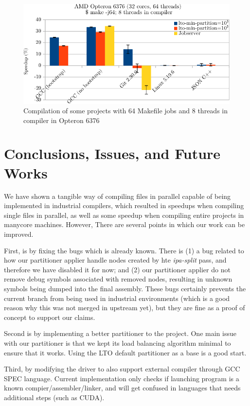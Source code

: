\documentclass[runningheads]{llncs}
\begin{document}
\begin{figure}
\centering
	 \includegraphics[scale=0.75]{figuras/experiment_projects_new-crop.pdf}
	  \caption{Compilation of some projects with 64 Makefile jobs and 8 threads in compiler in Opteron 6376}
	  \label{fig:gcc_projects}
\end{figure}

\section{Conclusions, Issues, and Future Works}\label{sec:future_works}

We have shown a tangible way of compiling files in parallel capable
of being implemented in industrial compilers, which resulted in
speedups when compiling single files in parallel, as well as some
speedup when compiling entire projects in manycore machines. However,
There are several points in which our work can be improved.

First, is by fixing the bugs which is already known. There is (1) a bug related
to how our partitioner applier handle nodes created by hte \textit{ipa-split}
pass, and therefore we have disabled it for now; and (2) our partitioner
applier do not remove debug symbols associated with removed nodes, resulting in
unknown symbols being dumped into the final assembly. These bugs certainly prevents the
current branch from being used in industrial environments (which is a good
reason why this was not merged in upstream yet), but they are fine as a proof
of concept to support our claims.

Second is by implementing a better partitioner to the project. One main issue
with our partitioner is that we kept its load balancing algorithm minimal to
ensure that it works. Using the LTO default partitioner as a base is a good start.

Third, by modifying the driver to also support external compiler through GCC
SPEC language. Current implementation only checks if launching program
is a known compier/assembler/linker, and will get confused in languages that
needs additional steps (such as CUDA).
\end{document}
